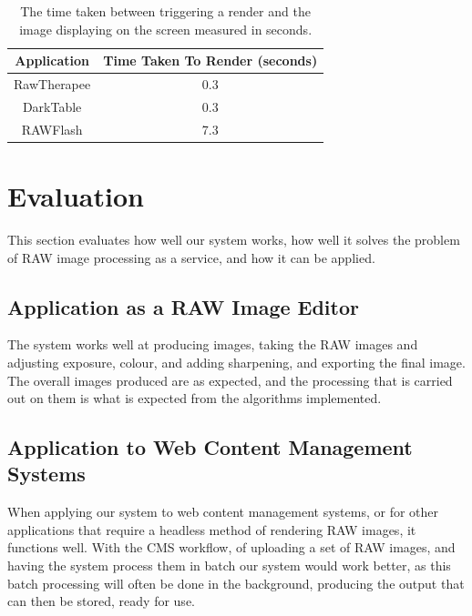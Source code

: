 \documentclass[10pt,a4paper]{article}
\begin{document}
\begin{table}
    \centering
    \begin{tabular}{| c | c |}
        \hline
        Application & Time Taken To Render (seconds)\\
        \hline
        RawTherapee & 0.3\\
        DarkTable & 0.3 \\
        RAWFlash & 7.3 \\
        \hline
    \end{tabular}
    \caption{The time taken between triggering a render and the image displaying on the screen measured in seconds.}
    \label{RenderTimeTable}
\end{table}

\section{Evaluation}
This section evaluates how well our system works, how well it solves the problem of RAW image processing as a service,
and how it can be applied.

\subsection{Application as a RAW Image Editor}
The system works well at producing images, taking the RAW images and adjusting exposure, colour, and adding sharpening, and exporting the final image.
The overall images produced are as expected, and the processing that is carried out on them is what is expected from the algorithms implemented.


\subsection{Application to Web Content Management Systems}
When applying our system to web content management systems, or for other applications that require a headless method
of rendering RAW images, it functions well. With the CMS workflow, of uploading a set of RAW images, and having the system
process them in batch our system would work better, as this batch processing will often be done in the background, producing
the output that can then be stored, ready for use.
\end{document}
